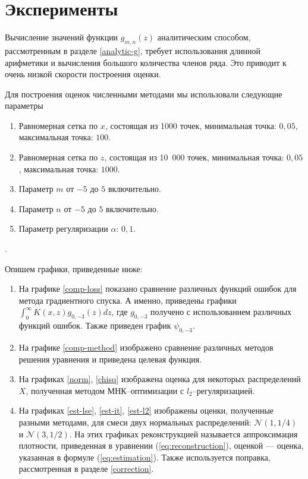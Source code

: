 \documentclass[../paper.tex]{subfiles}
\begin{document}
\section{Эксперименты}
%
Вычисление значений функции $g_{m,n}(z)$ аналитическим способом, рассмотренным в разделе \ref{analytic-g}, требует использования длинной арифметики
и вычисления большого количества членов ряда. Это приводит к очень низкой скорости построения оценки. 

Для построения оценок численными методами мы использовали следующие параметры
\begin{enumerate}
	\item Равномерная сетка по $x$, состоящая из 1000 точек, минимальная точка: $0{,}05$, максимальная точка: $100$.
	\item Равномерная сетка по $z$, состоящая из 10~000 точек, минимальная точка: $0{,}05$, максимальная точка: $1000$.
	\item Параметр $m$ от $-5$ до $5$ включительно.
	\item Параметр $n$ от $-5$ до $5$ включительно.
	\item Параметр регуляризации $\alpha$: $0{,}1$.
\end{enumerate}.

Опишем графики, приведенные ниже:
\begin{enumerate}
	\item На графике \ref{comp-loss} показано сравнение различных функций ошибок для метода градиентного спуска.
		А именно, приведены графики $\int_0^\infty K(x,z)g_{0,-3}(z)dz$, где $g_{0,-3}$ получено с использованием различных функций ошибок.
		Также приведен график $\psi_{0,-3}$.
	\item На графике \ref{comp-method} изображено сравнение различных методов решения уравнения и приведена целевая функция.
	\item На графиках \ref{norm}, \ref{chisq} изображена оценка для некоторых распределений $X$, полученная методом МНК--оптимизации с $l_2$--регуляризацией.
	\item На графиках \ref{est-lse}, \ref{est-it}, \ref{est-l2} изображены оценки, 
		полученные разными методами, для смеси двух нормальных распределений: $\mathcal{N}(1, 1/4)$ и $\mathcal{N}(3, 1/2)$.
		На этих графиках реконструкцией называется аппроксимация плотности, приведенная в уравнении (\ref{eq:reconstruction}), оценкой --- оценка, указанная в формуле (\ref{eq:estimation}). Также используется поправка, рассмотренная в разделе \ref{correction}.
\end{enumerate}
\end{document}
